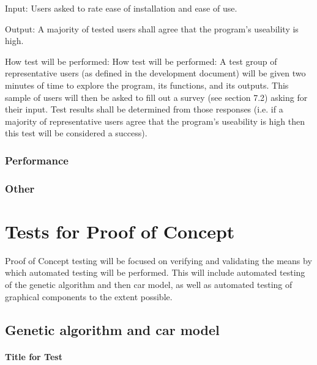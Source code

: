 \documentclass[12pt, titlepage]{article}
\begin{document}
\begin{enumerate}
Input: Users asked to rate ease of installation and ease of use.
					
Output: A majority of tested users shall agree  that the program's useability is high.
					
How test will be performed: How test will be performed: A test group of representative users (as defined in the development document) will be given two minutes of time to explore the program, its functions, and its outputs. This sample of users will then be asked to fill out a survey (see section 7.2) asking for their input. Test results shall be determined from those responses (i.e. if a majority of representative users agree that the program's useability is high then this test will be considered a success).

\end{enumerate}

\subsubsection{Performance}

\subsubsection{Other}

\section{Tests for Proof of Concept}

Proof of Concept testing will be focused on verifying and validating the means by which automated testing will be performed. This will include automated testing of the genetic algorithm and then car model, as well as automated testing of graphical components to the extent possible.

\subsection{Genetic algorithm and car model}
		
\paragraph{Title for Test}
\end{document}
